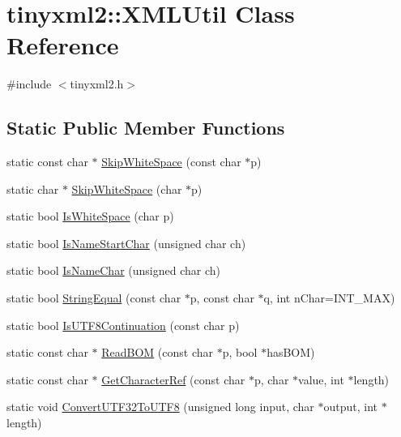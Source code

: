 \hypertarget{classtinyxml2_1_1_x_m_l_util}{}\section{tinyxml2\+:\+:X\+M\+L\+Util Class Reference}
\label{classtinyxml2_1_1_x_m_l_util}


{\ttfamily \#include $<$tinyxml2.\+h$>$}

\subsection*{Static Public Member Functions}
\begin{DoxyCompactItemize}
\item 
static const char $\ast$ \hyperlink{classtinyxml2_1_1_x_m_l_util_a9333d20f2a34325b5115ca45849c4b2a}{Skip\+White\+Space} (const char $\ast$p)
\item 
static char $\ast$ \hyperlink{classtinyxml2_1_1_x_m_l_util_aa48025be8843ec5a79b65579d31bd8fc}{Skip\+White\+Space} (char $\ast$p)
\item 
static bool \hyperlink{classtinyxml2_1_1_x_m_l_util_a357ec3af8fc433d19023a815f45e8e33}{Is\+White\+Space} (char p)
\item 
static bool \hyperlink{classtinyxml2_1_1_x_m_l_util_abe106a69ac4d942a4381a4d9dfd0e0bd}{Is\+Name\+Start\+Char} (unsigned char ch)
\item 
static bool \hyperlink{classtinyxml2_1_1_x_m_l_util_a04b17341538fa11752f24b4301d19485}{Is\+Name\+Char} (unsigned char ch)
\item 
static bool \hyperlink{classtinyxml2_1_1_x_m_l_util_acfcd287cacfd2533e1bc9ea4dfb56602}{String\+Equal} (const char $\ast$p, const char $\ast$q, int n\+Char=I\+N\+T\+\_\+\+M\+A\+X)
\item 
static bool \hyperlink{classtinyxml2_1_1_x_m_l_util_a9780b5926e30fe6222e10f0e6cf5a04a}{Is\+U\+T\+F8\+Continuation} (const char p)
\item 
static const char $\ast$ \hyperlink{classtinyxml2_1_1_x_m_l_util_ae9bcb2bc3cd6475fdc644c8c17790555}{Read\+B\+O\+M} (const char $\ast$p, bool $\ast$has\+B\+O\+M)
\item 
static const char $\ast$ \hyperlink{classtinyxml2_1_1_x_m_l_util_a5a96e5144a8d693dc4bcd783d9964648}{Get\+Character\+Ref} (const char $\ast$p, char $\ast$value, int $\ast$length)
\item 
static void \hyperlink{classtinyxml2_1_1_x_m_l_util_a31c00d5c5dfb38382de1dfcaf4be3595}{Convert\+U\+T\+F32\+To\+U\+T\+F8} (unsigned long input, char $\ast$output, int $\ast$length)

\end{DoxyCompactItemize}
